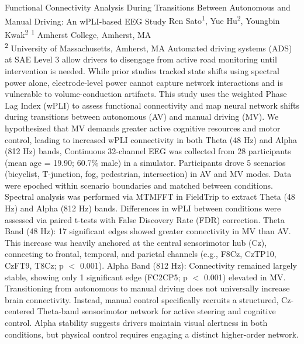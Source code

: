\makeabstract
    {
    Functional Connectivity Analysis During Transitions Between Autonomous and Manual Driving: An wPLI-based EEG Study
    }
    {
    Ren Sato\textsuperscript{1}, Yue Hu\textsuperscript{2}, Youngbin Kwak\textsuperscript{2}
    }
    {
    \textsuperscript{1} Amherst College, Amherst, MA\\
\textsuperscript{2} University of Massachusetts, Amherst, MA
    }
    {
    Automated driving systems (ADS) at SAE Level 3 allow drivers to disengage from active road monitoring until intervention is needed. While prior studies tracked state shifts using spectral power alone, electrode-level power cannot capture network interactions and is vulnerable to volume-conduction artifacts. This study uses the weighted Phase Lag Index (wPLI) to assess functional connectivity and map neural network shifts during transitions between autonomous (AV) and manual driving (MV). We hypothesized that MV demands greater active cognitive resources and motor control, leading to increased wPLI connectivity in both Theta (4{\textendash}8 Hz) and Alpha (8{\textendash}12 Hz) bands,
    }
    {
    Continuous 32-channel EEG was collected from 28 participants (mean age = 19.90; 60.7\% male) in a simulator. Participants drove 5 scenarios (bicyclist, T-junction, fog, pedestrian, intersection) in AV and MV modes. Data were epoched within scenario boundaries and matched between conditions. Spectral analysis was performed via MTMFFT in FieldTrip to extract Theta (4{\textendash}8 Hz) and Alpha (8{\textendash}12 Hz) bands. Differences in wPLI between conditions were assessed via paired t-tests with False Discovery Rate (FDR) correction.
    }
    {
    Theta Band (4{\textendash}8 Hz): 17 significant edges showed greater connectivity in MV than AV. This increase was heavily anchored at the central sensorimotor hub (Cz), connecting to frontal, temporal, and parietal channels (e.g., F8{\textendash}Cz, Cz{\textendash}TP10, Cz{\textendash}FT9, T8{\textendash}Cz; p \ensuremath{<} 0.001). Alpha Band (8{\textendash}12 Hz): Connectivity remained largely stable, showing only 1 significant edge (FC2{\textendash}CP5; p \ensuremath{<} 0.001) elevated in MV.
    }
    {
    Transitioning from autonomous to manual driving does not universally increase brain connectivity. Instead, manual control specifically recruits a structured, Cz-centered Theta-band sensorimotor network for active steering and cognitive control. Alpha stability suggests drivers maintain visual alertness in both conditions, but physical control requires engaging a distinct higher-order network.
    }

    \newpage
    